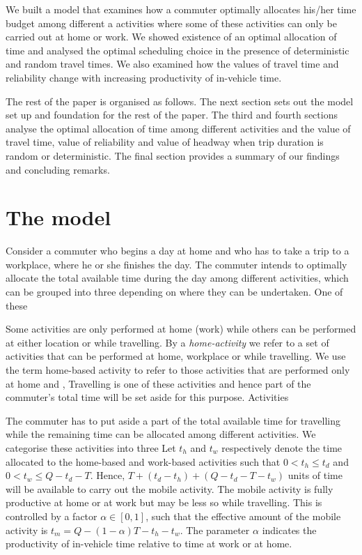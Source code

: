 \documentclass[12pt,a4paper,british]{article}
\theoremstyle{definition}
\theoremstyle{plain}
\theoremstyle{plain}
\begin{document}
We built a model that examines how a commuter optimally allocates his/her time budget among different a activities where some of these activities can only be carried out at home or work. We showed existence of an optimal allocation of time and analysed the optimal scheduling choice in the presence of deterministic and random travel times. We also examined how the values of travel time and reliability change with increasing productivity of in-vehicle time.

The rest of the paper is organised as follows. The next section sets out the model set up and foundation for the rest of the paper. The third and fourth sections analyse the optimal allocation of time among different activities and the value of travel time, value of reliability and value of headway when trip duration is random or deterministic. The final section provides a summary of our findings and concluding remarks.

\section{The model}

Consider a commuter who begins a day at home and who has to take a trip to a workplace, where he or she finishes the day. The commuter intends to optimally allocate the total available time during the day among different activities, which can be grouped into three depending on where they can be undertaken. One of these 

Some activities are only performed at home (work) while others can be performed at either location or while travelling. By a \textit{home-activity} we refer to a set  of activities that can be performed at home, workplace or while travelling. We use the term home-based activity to refer to those activities that are performed only at home and , Travelling is one of these activities and hence part of the commuter's total time will be set aside for this purpose. Activities 

The commuter has to put aside a part of the total available time for travelling while the remaining time can be allocated among different activities. We categorise these activities into three Let $t_{h}$ and $t_{w}$ respectively denote the time allocated to the home-based and work-based activities such that $0<t_{h}\leq t_{d}$ and $0<t_{w}\leq Q-t_{d}-T$. Hence, $T+\left(t_{d}-t_{h}\right)+\left(Q-t_{d}-T-t_{w}\right)$ units of time will be available to carry out the mobile activity. The mobile activity is fully productive at home or at work but may be less so while travelling. This is controlled by a factor $\alpha\in\left[0,1\right]$, such that the effective amount of the mobile activity is $t_{m}=Q-\left(1-\alpha\right)T-t_{h}-t_{w}$. The parameter $\alpha$ indicates the productivity of in-vehicle time relative to time at work or at home.
\end{document}

